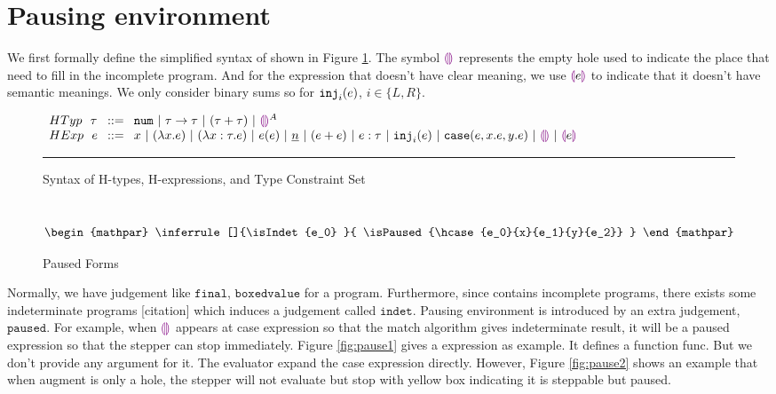 \section{Pausing environment}
\label{sec:pause}

We first formally define the simplified syntax of \Hazel shown in Figure \ref{fig:syntax}. The symbol $\textcolor{violet}{\llparenthesis}\textcolor{violet}{\rrparenthesis}$ represents the empty hole used to indicate the place that need to fill in the incomplete program. And for the expression that doesn't have clear meaning, we use $\textcolor{violet}{\llparenthesis} e \textcolor{violet}{\rrparenthesis}$ to indicate that it doesn't have semantic meanings. We only consider binary sums so for $\mathtt{inj}_{i}({e})$,  $i \in \{L, R\}$.

\begin{figure}[htbp]
    \vspace{-3px} 
  $\arraycolsep=4pt\begin{array}{lll}
  HTyp~~ \tau & ::= &
    \tnum  ~\vert~
    \tarr{\tau}{\tau} ~\vert~
    (\tau + \tau) ~\vert~
    \ehole^A
    \\
  HExp~~ e & ::= &
    x ~\vert~
    \lamfunc{x}{e} ~\vert~
    \lamfunc{x:\tau}{e} ~\vert~
    e(e) ~\vert~
    \underlinenum{n} ~\vert~
    (e+e) ~\vert~
    e: \tau ~\vert~
    \hinj{i}{e} ~\vert~
    \hcase{e}{x}{e}{y}{e}~\vert~
    \ehole  ~\vert~
    \notehole{e} 
  \end{array}$
  \hrule
  \caption{Syntax of H-types, H-expressions, and Type Constraint Set}
    \label{fig:syntax}
    \vspace{-5px}
\end{figure}

\begin{figure}[htbp]
    \vspace{-3px} 
    ~~\hfill
    \begin{subequations}\label{eqns:paused}
    \begin{mathpar}
        \inferrule[]{\isIndet{e_0}
            }{
              \isPaused{\hcase{e_0}{x}{e_1}{y}{e_2}}
            }
    \end{mathpar}
  \end{subequations}
  \caption{Paused Forms}
  \label{fig:paused_forms}
    \vspace{-5px}
\end{figure}

Normally, we have judgement like $\mathtt{final}$, $\mathtt{boxedvalue}$ for a program. Furthermore, since \Hazel contains incomplete programs, there exists some indeterminate programs [citation] which induces a judgement called $\mathtt{indet}$. Pausing environment is introduced by an extra judgement, $\mathtt{paused}$. For example, when $\textcolor{violet}{\llparenthesis}\textcolor{violet}{\rrparenthesis}$ appears at case expression so that the match algorithm gives indeterminate result, it will be a paused expression so that the stepper can stop immediately. Figure \ref{fig:pause1} gives a expression as example. It defines a function func. But we don't provide any argument for it. The evaluator expand the case expression directly. However, Figure \ref{fig:pause2} shows an example that when augment is only a hole, the stepper will not evaluate but stop with yellow box indicating it is steppable but paused.

